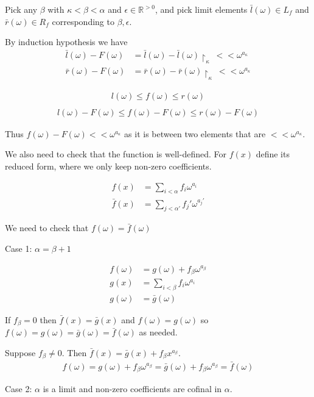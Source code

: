 \documentclass{article}
\newcommand{\R}{\mathbb{R}}
\newcommand{\w}{\omega}
\newcommand{\midr}[1]{\restriction_{#1}}
\begin{document}
Pick any $\beta$ with $\kappa < \beta < \alpha$ and $\epsilon \in \R^{>0}$,
and pick limit elements $\bar l(\w) \in L_f$ and $\bar r(\w) \in R_f$ corresponding to $\beta, \epsilon$.

By induction hypothesis we have 
\begin{align*}
	\bar l(\w) - F(\w) &= \bar l(\w) - \bar l(\w)\midr\kappa \ <<  \w^{a_\kappa} \\
	\bar r(\w) - F(\w) &= \bar r(\w) - \bar r(\w)\midr\kappa \ <<  \w^{a_\kappa}
\end{align*}

\begin{align*}
	l(\w) \leq f(\w) \leq r(\w) \\
\end{align*}
\begin{align*}
	l(\w) - F(\w) \leq f(\w) - F(\w) \leq r(\w) - F(\w)
\end{align*}
 
Thus $f(\w) - F(\w) << \w^{a_\kappa}$ as it is between two elements that are $<<  \w^{a_\kappa}$.

We also need to check that the function is well-defined. For $f(x)$ define its reduced form, where we only keep non-zero coefficients.

\begin{align*}
	f(x) &= \sum_{i < \alpha} f_i \w^{a_i} \\
	\bar f(x) &= \sum_{j < \alpha'} f_j' \w^{a_j'}
\end{align*}

We need to check that $f(\w) = \bar f(\w)$

Case 1: $\alpha = \beta + 1$

\begin{align*}
	f(\w) &= g(\w) + f_\beta \w^{a_\beta} \\
	g(x) &= \sum_{i < \beta} f_i \w^{a_i} \\
	g(\w) &= \bar g(\w)
\end{align*}

If $f_\beta = 0$ then $\bar f(x) = \bar g(x)$ and $f(\w) = g(\w)$ so $f(\w) = g(\w) = \bar g(\w) = \bar f(\w)$ as needed.

Suppose $f_\beta \neq 0$. Then $\bar f(x) = \bar g(x) + f_\beta x^{a_\beta}$.
\begin{align*}
	f(\w) = g(\w) + f_\beta \w^{a_\beta} = \bar g(\w) + f_\beta \w^{a_\beta} = \bar f(\w)
\end{align*}

Case 2: $\alpha$ is a limit and non-zero coefficients are cofinal in $\alpha$.
\end{document}
